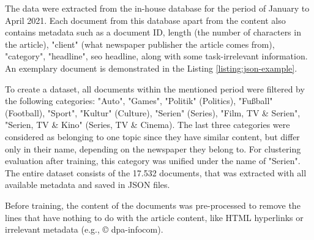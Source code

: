 \documentclass[fontsize=12pt,a4paper,twoside,openany]{scrbook}
\begin{document}
The data were extracted from the in-house database for the period of January to April 2021. Each document from this database apart from the content also contains metadata such as a document ID, length (the number of characters in the article), "client" (what newspaper publisher the article comes from), "category", "headline", seo headline, along with some task-irrelevant information. An exemplary document is demonstrated in the Listing \ref{listing:json-example}.

To create a dataset, all documents within the mentioned period were filtered by the following categories: "Auto", "Games", "Politik" (Politics), "Fußball" (Football), "Sport", "Kultur" (Culture), "Serien" (Series), "Film, TV \& Serien", "Serien, TV \& Kino" (Series, TV \& Cinema). The last three categories were considered as belonging to one topic since they have similar content, but differ only in their name, depending on the newspaper they belong to. For clustering evaluation after training, this category was unified under the name of "Serien". The entire dataset consists of the 17.532 documents, that was extracted with all available metadata and saved in JSON files.

Before training, the content of the documents was pre-processed to remove the lines that have nothing to do with the article content, like HTML hyperlinks or irrelevant metadata (e.g., © dpa-infocom).
\end{document}
